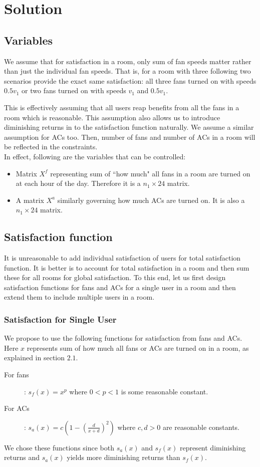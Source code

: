 \documentclass[a4paper]{article}
\begin{document}
\section{Solution} 
\subsection{Variables}
We assume that for satisfaction in a room, only sum of fan speeds matter rather than just the individual fan speeds. 
That is, for a room with three following two scenarios provide the exact same satisfaction: all three fans turned on with speeds $0.5v_1$ or two fans turned on with speeds $v_1$ and $0.5v_1$.  

This is effectively assuming that all users reap benefits from all the fans in a room which is reasonable. 
This assumption also allows us to introduce diminishing returns in to the satisfaction function naturally. We assume a similar assumption for ACs too. Then, number of fans and number of ACs in a room will be reflected in the constraints.
\\

In effect, following are the variables that can be controlled:
\begin{itemize}
\item Matrix $X^{f}$ representing sum of ``how much" all fans in a room are turned on at each hour of the day. Therefore it is a $n_1\times 24$ matrix.
\item A matrix $X^a$ similarly governing how much ACs are turned on. It is also a $n_1\times 24$ matrix.
\end{itemize}

\subsection{Satisfaction function}
It is unreasonable to add individual satisfaction of users for total satisfaction function. It is better is to account for total satisfaction in a room and then sum these for all rooms for global satisfaction. To this end, let us first design satisfaction functions for fans and ACs for a single user in a room and then extend them to include multiple users in a room.

\subsubsection{Satisfaction for Single User}
We propose to use the following functions for satisfaction from fans and ACs. 
Here $x$ represents sum of how much all fans or ACs are turned on in a room, as explained in section $2.1$.
\begin{description}
\item[For fans]: $s_f(x) = x^{p}$ where $0 < p < 1$ is some reasonable constant.
\item[For ACs]: $s_a(x) = c\left(1- \left (\frac{d}{x+d}\right )^2\right)$ where $c,d > 0$ are reasonable constants.
\end{description}
We chose these functions since both $s_a(x)$ and $s_f(x)$ represent diminishing returns and $s_a(x)$ yields more diminishing returns than $s_f(x)$.
\end{document}
